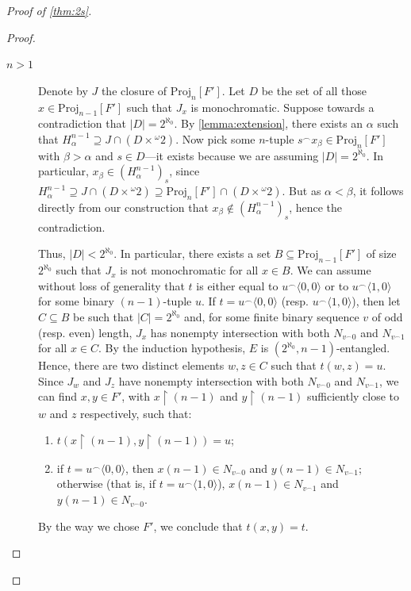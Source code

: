 \documentclass[12pt]{amsart}
\theoremstyle{definition}
\theoremstyle{remark}
\begin{document}
\begin{proof}[Proof of \cref{thm:2s}]
\begin{proof}
\begin{description}
\item[$n > 1$] Denote by $J$ the closure of $\mathrm{Proj}_{n}[F']$. Let $D$ be the set of all those $x \in \mathrm{Proj}_{n-1}[F']$ such that $J_x$ is monochromatic. Suppose towards a contradiction that $|D| = 2^{\aleph_0}$. By \cref{lemma:extension}, there exists an $\alpha$ such that $H_\alpha^{n-1} \supseteq J \cap (D\times {}^\omega 2)$. Now pick some $n$-tuple $s^\smallfrown x_\beta \in \mathrm{Proj}_n[F']$ with $\beta > \alpha$ and $s \in D$---it exists because we are assuming $|D| = 2^{\aleph_0}$. In particular, $x_\beta \in (H_\alpha^{n-1})_s$, since $H_\alpha^{n-1} \supseteq J \cap (D\times {}^\omega 2) \supseteq \mathrm{Proj}_n[F'] \cap (D\times {}^\omega 2)$. But as $\alpha < \beta$, it follows directly from our construction that $x_\beta \not\in (H_\alpha^{n-1})_s$, hence the contradiction. 

Thus, $|D| < 2^{\aleph_0}$. In particular, there exists a set $B\subseteq \mathrm{Proj}_{n-1}[F']$ of size $2^{\aleph_0}$ such that $J_x$ is not monochromatic for all $x \in B$. We can assume without loss of generality that $t$ is either equal to $u^\smallfrown \langle 0,0\rangle$  or to  $u^\smallfrown \langle 1,0\rangle$ for some binary $(n-1)$-tuple $u$. If $t = u^\smallfrown \langle 0,0\rangle$ (resp. $u^\smallfrown \langle 1,0\rangle$), then let $C \subseteq B$ be such that $|C| = 2^{\aleph_0}$ and, for some finite binary sequence $v$ of odd (resp. even) length, $J_x$ has nonempty intersection with both $N_{v^\smallfrown 0}$ and $N_{v^\smallfrown 1}$ for all $x \in C$. By the induction hypothesis, $E$ is $(2^{\aleph_0}, n-1)$-entangled. Hence, there are two distinct elements $w,z \in  C$ such that $t(w,z) = u$. Since $J_w$ and $J_z$ have nonempty intersection with both $N_{v^\smallfrown 0}$ and $N_{v^\smallfrown 1}$, we can find $x,y \in F'$, with $x \upharpoonright (n-1)$ and $y \upharpoonright (n-1)$ sufficiently close to $w$ and $z$ respectively, such that:
\begin{enumerate}
\itemsep0.3em
\item $t(x \upharpoonright (n-1), y \upharpoonright (n-1)) = u$;
\item if $t = u^\smallfrown \langle 0, 0\rangle$, then $x(n-1) \in N_{v^\smallfrown 0}$ and $y(n-1) \in N_{v^\smallfrown 1}$; otherwise (that is, if $t = u^\smallfrown \langle 1, 0\rangle$), $x(n-1) \in N_{v^\smallfrown 1}$ and $y(n-1) \in N_{v^\smallfrown 0}$. 
\end{enumerate}
By the way we chose $F'$, we conclude that $t(x, y) = t$.
\end{description}



\end{proof}
\end{proof}
\end{document}
